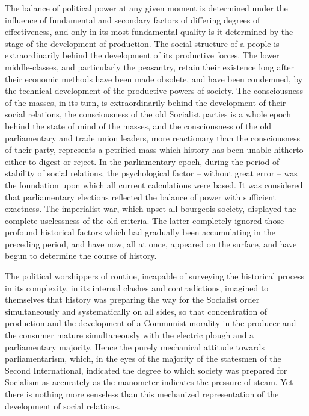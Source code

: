 \documentclass[12pt]{article}
\begin{document}
\vspace{12pt}
The balance of political power at any given moment is determined under
the influence of fundamental and secondary factors of differing
degrees of effectiveness, and only in its most fundamental quality is
it determined by the stage of the development of production. The
social structure of a people is extraordinarily behind the development
of its productive forces. The lower middle-classes, and particularly
the peasantry, retain their existence long after their economic
methods have been made obsolete, and have been condemned, by the
technical development of the productive powers of society. The
consciousness of the masses, in its turn, is extraordinarily behind
the development of their social relations, the consciousness of the
old Socialist parties is a whole epoch behind the state of mind of the
masses, and the consciousness of the old parliamentary and trade union
leaders, more reactionary than the consciousness of their party,
represents a petrified mass which history has been unable hitherto
either to digest or reject. In the parliamentary epoch, during the
period of stability of social relations, the psychological
factor -- without great error -- was the foundation upon which all current
calculations were based. It was considered that parliamentary
elections reflected the balance of power with sufficient exactness.
The imperialist war, which upset all bourgeois society, displayed the
complete uselessness of the old criteria. The latter completely
ignored those profound historical factors which had gradually been
accumulating in the preceding period, and have now, all at once,
appeared on the surface, and have begun to determine the course of
history.

\vspace{12pt}
The political worshippers of routine, incapable of surveying the
historical process in its complexity, in its internal clashes and
contradictions, imagined to themselves that history was preparing the
way for the Socialist order simultaneously and systematically on all
sides, so that concentration of production and the development of a
Communist morality in the producer and the consumer mature
simultaneously with the electric plough and a parliamentary majority.
Hence the purely mechanical attitude towards parliamentarism, which,
in the eyes of the majority of the statesmen of the Second
International, indicated the degree to which society was prepared for
Socialism as accurately as the manometer indicates the pressure of
steam. Yet there is nothing more senseless than this mechanized
representation of the development of social relations.
\end{document}
